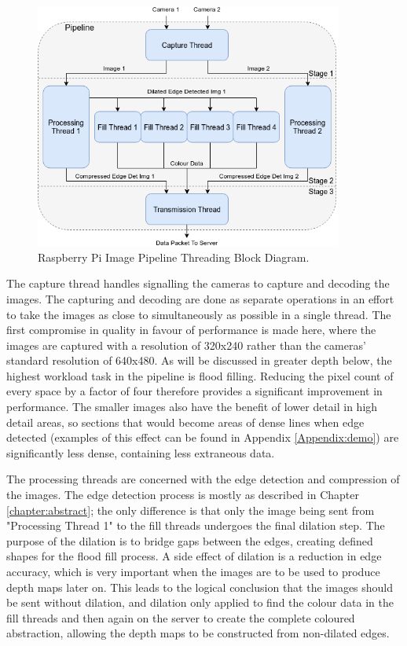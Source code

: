 \begin{figure}[H]
    \begin{center}
      \includegraphics[width=0.9\textwidth]{Figures/Threads.png}
      \caption[Raspberry Pi Image Pipeline Threading Block Diagram]{Raspberry Pi Image Pipeline Threading Block Diagram.}
      \label{fig:threads}
    \end{center}
\end{figure}

The capture thread handles signalling the cameras to capture and decoding the images. The capturing and decoding are done as separate operations in an effort to take the images as close to simultaneously as possible in a single thread. The first compromise in quality in favour of performance is made here, where the images are captured with a resolution of 320x240 rather than the cameras' standard resolution of 640x480. As will be discussed in greater depth below, the highest workload task in the pipeline is flood filling. Reducing the pixel count of every space by a factor of four therefore provides a significant improvement in performance. The smaller images also have the benefit of lower detail in high detail areas, so sections that would become areas of dense lines when edge detected (examples of this effect can be found in Appendix \ref{Appendix:demo}) are significantly less dense, containing less extraneous data.

The processing threads are concerned with the edge detection and compression of the images. The edge detection process is mostly as described in Chapter \ref{chapter:abstract}; the only difference is that only the image being sent from "Processing Thread 1" to the fill threads undergoes the final dilation step. The purpose of the dilation is to bridge gaps between the edges, creating defined shapes for the flood fill process. A side effect of dilation is a reduction in edge accuracy, which is very important when the images are to be used to produce depth maps later on. This leads to the logical conclusion that the images should be sent without dilation, and dilation only applied to find the colour data in the fill threads and then again on the server to create the complete coloured abstraction, allowing the depth maps to be constructed from non-dilated edges. 

